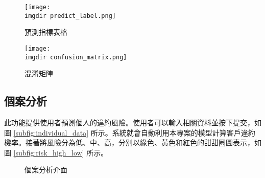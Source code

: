 \documentclass[12pt, a4paper]{article}
\begin{document}
\begin{figure}[H]
    \centering
    \begin{minipage}{0.45\textwidth}
        \centering
        \texttt{[image: \\imgdir predict\_label.png]}
        \caption{預測指標表格}
        \label{fig:predict_label}
    \end{minipage}
    \hfill
    \begin{minipage}{0.45\textwidth}
        \centering
        \texttt{[image: \\imgdir confusion\_matrix.png]}
        \caption{混淆矩陣}
        \label{fig:confusion_matrix}
    \end{minipage}
\end{figure}

\subsection{個案分析}
此功能提供使用者預測個人的違約風險。使用者可以輸入相關資料並按下提交，如圖 \ref{subfig:individual_data} 所示。系統就會自動利用本專案的模型計算客戶違約機率。接著將風險分為低、中、高，分別以綠色、黃色和紅色的甜甜圈圖表示，如圖 \ref{subfig:risk_high_low} 所示。

\begin{figure}[H]
	\centering
	
	
	
	\caption{個案分析介面}\label{fig:indivudial}
\end{figure}


\newpage
\end{document}
